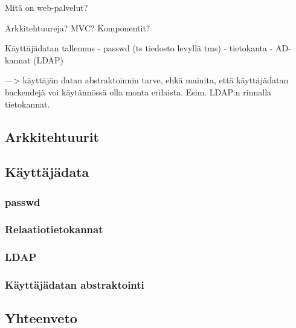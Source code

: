 Mitä on web-palvelut?

Arkkitehtuureja? MVC? Komponentit?

Käyttäjädatan tallennus
- passwd (ts tiedosto levyllä tms)
- tietokanta
- AD-kannat (LDAP)

---> käyttäjän datan abstraktoinnin tarve, ehkä mainita, että käyttäjädatan backendejä voi käytännössä olla monta erilaista. Esim. LDAP:n rinnalla tietokannat.


\subsection{Arkkitehtuurit}

\subsection{Käyttäjädata}

\subsubsection{passwd}

\subsubsection{Relaatiotietokannat}

\subsubsection{LDAP}

\subsubsection{Käyttäjädatan abstraktointi}

\subsection{Yhteenveto}
